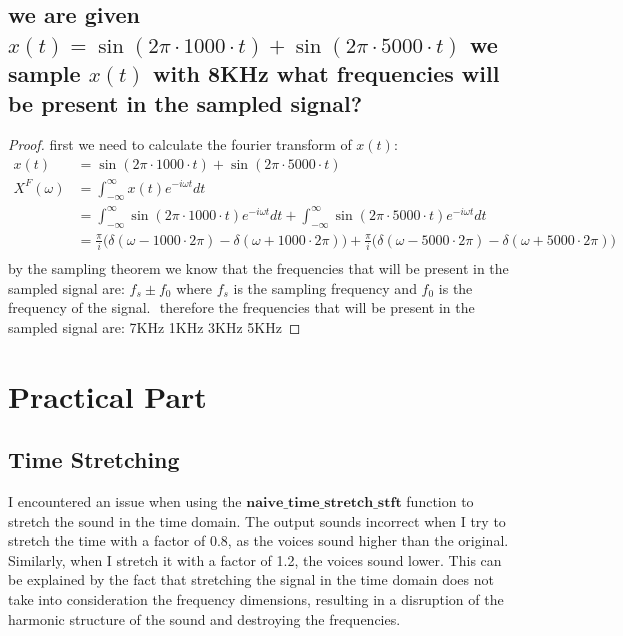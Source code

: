 \documentclass{article}
\begin{document}
\subsection{we are given $x(t)=\sin(2\pi \cdot 1000\cdot t)+\sin(2\pi \cdot 5000 \cdot t)$ we sample $x(t)$ with 8KHz what frequencies will be present in the sampled signal?}
\begin{proof}
    first we need to calculate the fourier transform of $x(t)$:
    \begin{equation}
        \begin{aligned}
            x(t) &= \sin(2\pi \cdot 1000\cdot t)+\sin(2\pi \cdot 5000 \cdot t)\\
            X^F(\omega) &= \int_{-\infty}^{\infty}x(t)e^{-i\omega t}dt\\
            &= \int_{-\infty}^{\infty}\sin(2\pi \cdot 1000\cdot t)e^{-i\omega t}dt + \int_{-\infty}^{\infty}\sin(2\pi \cdot 5000 \cdot t)e^{-i\omega t}dt\\
            &= \frac{\pi}{i}\bigg(\delta(\omega - 1000 \cdot 2\pi) - \delta(\omega + 1000 \cdot 2\pi)\bigg) + \frac{\pi}{i}\bigg(\delta(\omega - 5000\cdot 2\pi) - \delta(\omega + 5000\cdot 2\pi)\bigg)\\
        \end{aligned}
    \end{equation}
    by the sampling theorem we know that the frequencies that will be present in the sampled signal are: $f_s \pm f_0$ where $f_s$ is the sampling frequency and $f_0$ is the frequency of the signal.
    $ $\newline
    therefore the frequencies that will be present in the sampled signal are: 7KHz 1KHz 3KHz 5KHz
\end{proof}

\section{Practical Part}
\subsection{Time Stretching}
I encountered an issue when using the $\textbf{naive\_time\_stretch\_stft}$ function to
stretch the sound in the time domain. The output sounds incorrect when I try to
stretch the time with a factor of 0.8, as the voices sound higher than the
original. Similarly, when I stretch it with a factor of 1.2, the voices sound
lower. This can be explained by the fact that stretching the signal in the time
domain does not take into consideration the frequency dimensions, resulting in
a disruption of the harmonic structure of the sound and destroying the
frequencies.\\
\end{document}
